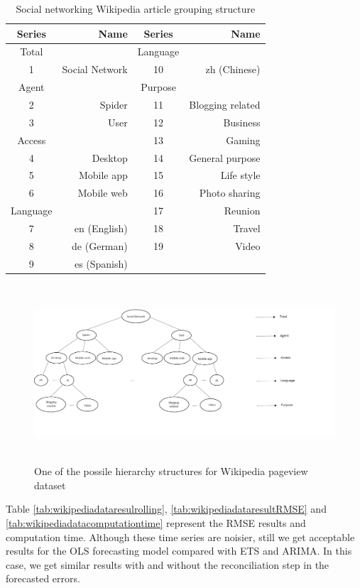 \documentclass[11pt,a4paper,]{article}
\begin{document}
\begin{table}[t]

\caption{\label{tab:wikipediagroupingstructure}Social networking Wikipedia article grouping structure}
\centering
\begin{tabular}{crcr}
\toprule
Series & Name & Series & Name\\
\midrule
Total &  & Language & \\
1 & Social Network & 10 & zh (Chinese)\\
Agent &  & Purpose & \\
2 & Spider & 11 & Blogging related\\
3 & User & 12 & Business\\
Access &  & 13 & Gaming\\
4 & Desktop & 14 & General purpose\\
5 & Mobile app & 15 & Life style\\
6 & Mobile web & 16 & Photo sharing\\
Language &  & 17 & Reunion\\
7 & en (English) & 18 & Travel\\
8 & de (German) & 19 & Video\\
9 & es (Spanish) &  & \\
\bottomrule
\end{tabular}
\end{table}

\begin{figure}

{\centering \includegraphics[width=500px,height=250px]{Paper-Figures/Wiki_group_structure} 

}

\caption{One of the possile hierarchy structures for Wikipedia pageview dataset}\label{fig:wikigroupstructure}
\end{figure}

Table \ref{tab:wikipediadataresulrolling},
\ref{tab:wikipediadataresultRMSE} and
\ref{tab:wikipediadatacomputationtime} represent the RMSE results and
computation time. Although these time series are noisier, still we get
acceptable results for the OLS forecasting model compared with ETS and
ARIMA. In this case, we get similar results with and without the
reconciliation step in the forecasted errors.
\end{document}
